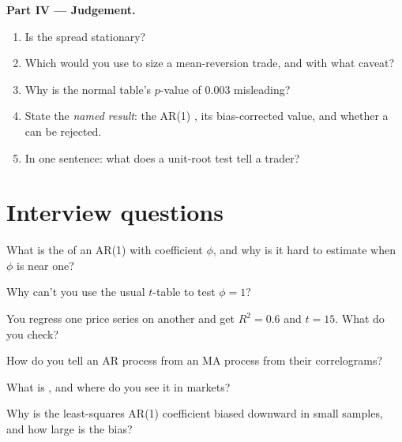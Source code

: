 \begin{problem}
\medskip\noindent\textbf{Part IV --- Judgement.}
\begin{enumerate}[resume]
\item Is the spread stationary?
\item Which  would you use to size a mean-reversion trade, and with what caveat?
\item Why is the normal table's $p$-value of 0.003 misleading?
\item State the \emph{named result}: the AR(1) , its bias-corrected value, and whether a  can be rejected.
\item In one sentence: what does a unit-root test tell a trader?
\end{enumerate}
\end{problem}

\section{Interview questions}

\begin{interviewq}\label{iq:qm:linear-time-series:1}
What is the  of an AR(1) with coefficient $\phi$, and why is it hard to estimate when $\phi$ is near one?
\end{interviewq}

\begin{interviewq}\label{iq:qm:linear-time-series:2}
Why can't you use the usual $t$-table to test $\phi = 1$?
\end{interviewq}

\begin{interviewq}\label{iq:qm:linear-time-series:3}
You regress one price series on another and get $R^2 = 0.6$ and $t = 15$. What do you check?
\end{interviewq}

\begin{interviewq}\label{iq:qm:linear-time-series:4}
How do you tell an AR process from an MA process from their correlograms?
\end{interviewq}

\begin{interviewq}\label{iq:qm:linear-time-series:5}
What is , and where do you see it in markets?
\end{interviewq}

\begin{interviewq}\label{iq:qm:linear-time-series:6}
Why is the least-squares AR(1) coefficient biased downward in small samples, and how large is the bias?
\end{interviewq}
